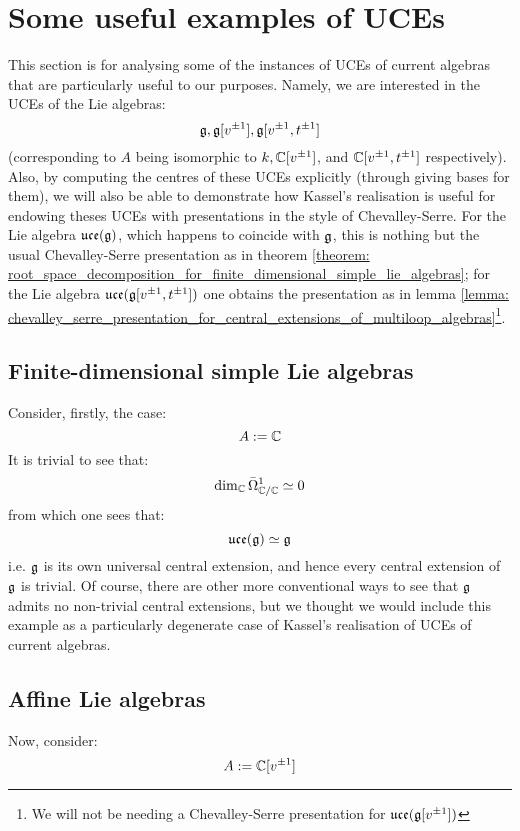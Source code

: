 \section{Some useful examples of UCEs}
    This section is for analysing some of the instances of UCEs of current algebras that are particularly useful to our purposes. Namely, we are interested in the UCEs of the Lie algebras:
        $$\mathfrak{g}, \mathfrak{g}[v^{\pm 1}], \mathfrak{g}[v^{\pm 1}, t^{\pm 1}]$$
    (corresponding to $A$ being isomorphic to $k, \mathbb{C}[v^{\pm 1}]$, and $\mathbb{C}[v^{\pm 1}, t^{\pm 1}]$ respectively). Also, by computing the centres of these UCEs explicitly (through giving bases for them), we will also be able to demonstrate how Kassel's realisation is useful for endowing theses UCEs with presentations in the style of Chevalley-Serre. For the Lie algebra $\mathfrak{uce}(\mathfrak{g})$, which happens to coincide with $\mathfrak{g}$, this is nothing but the usual Chevalley-Serre presentation as in theorem \ref{theorem: root_space_decomposition_for_finite_dimensional_simple_lie_algebras}; for the Lie algebra $\mathfrak{uce}(\mathfrak{g}[v^{\pm 1}, t^{\pm 1}])$ one obtains the presentation as in lemma \ref{lemma: chevalley_serre_presentation_for_central_extensions_of_multiloop_algebras}\footnote{We will not be needing a Chevalley-Serre presentation for $\mathfrak{uce}(\mathfrak{g}[v^{\pm 1}])$}.

    \subsection{Finite-dimensional simple Lie algebras}
        Consider, firstly, the case:
            $$A := \mathbb{C}$$
        It is trivial to see that:
            $$\dim_{\mathbb{C}} \bar{\Omega}^1_{\mathbb{C}/\mathbb{C}} \simeq 0$$
        from which one sees that:
            $$\mathfrak{uce}(\mathfrak{g}) \simeq \mathfrak{g}$$
        i.e. $\mathfrak{g}$ is its own universal central extension, and hence every central extension of $\mathfrak{g}$ is trivial. Of course, there are other more conventional ways to see that $\mathfrak{g}$ admits no non-trivial central extensions, but we thought we would include this example as a particularly degenerate case of Kassel's realisation of UCEs of current algebras.

    \subsection{Affine Lie algebras}
        Now, consider:
            $$A := \mathbb{C}[v^{\pm 1}]$$
    
